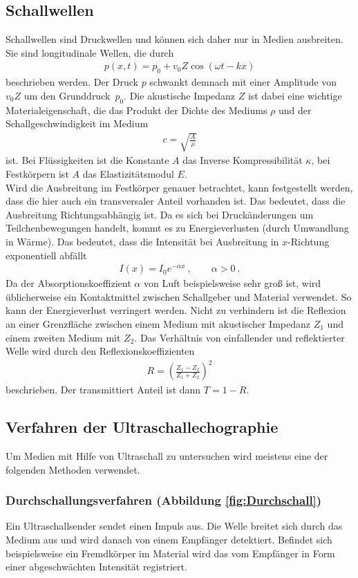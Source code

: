 \subsection{Schallwellen}
Schallwellen sind Druckwellen und können sich daher nur in Medien ausbreiten. Sie sind longitudinale Wellen, die durch
\begin{align}
	p(x, t) = p_0 + v_0 Z \cos(\omega t-kx)
\end{align}
beschrieben werden. Der Druck $p$ schwankt demnach mit einer Amplitude von $v_0Z$ um den \grqq Grunddruck\grqq\ $p_0$. Die akustische Impedanz $Z$ ist dabei eine wichtige Materialeigenschaft, die das Produkt der Dichte des Mediums $\rho$ und der Schallgeschwindigkeit im Medium
\begin{align}
	c = \sqrt{\frac{A}{\rho}}
\end{align}
ist. Bei Flüssigkeiten ist die Konstante $A$ das Inverse Kompressibilität $\kappa$, bei Festkörpern ist $A$ das Elastizitätsmodul $E$. \\
Wird die Ausbreitung im Festkörper genauer betrachtet, kann festgestellt werden, dass die hier auch ein transversaler Anteil vorhanden ist. Das bedeutet, dass die Ausbreitung Richtungsabhängig ist.
Da es sich bei Druckänderungen um Teilchenbewegungen handelt, kommt es zu Energieverlusten (durch Umwandlung in Wärme). Das bedeutet, dass die Intensität bei Ausbreitung in $x$-Richtung exponentiell abfällt
\begin{align}
	I(x) = I_0 e^{-\alpha x} \ ,\qquad \alpha>0 \ .
\end{align}
Da der Absorptionskoeffizient $\alpha$ von Luft beispielsweise sehr groß ist, wird üblicherweise ein Kontaktmittel zwischen Schallgeber und Material verwendet. So kann der Energieverlust verringert werden. Nicht zu verhindern ist die Reflexion an einer Grenzfläche zwischen einem Medium mit akustischer Impedanz $Z_1$ und einem zweiten Medium mit $Z_2$. Das Verhältnis von einfallender und reflektierter Welle wird durch den Reflexionskoeffizienten
\begin{align}
	R = \left(\frac{Z_1-Z_2}{Z_1+Z_2}\right)^2
\end{align}
beschrieben. Der transmittiert Anteil ist dann $T = 1-R$.
\subsection{Verfahren der Ultraschallechographie}
Um Medien mit Hilfe von Ultraschall zu untersuchen wird meistens eine der folgenden Methoden verwendet.
\subsubsection*{Durchschallungsverfahren (Abbildung \ref{fig:Durchschall})}
Ein Ultraschallsender sendet einen Impuls aus. Die Welle breitet sich durch das Medium aus und wird danach von einem Empfänger detektiert. Befindet sich beispielsweise ein Fremdkörper im Material wird das vom Empfänger in Form einer abgeschwächten Intensität registriert.
